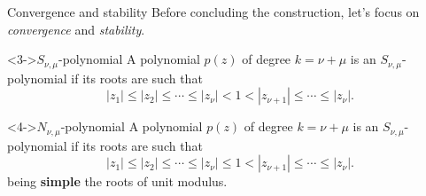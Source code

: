 \documentclass[aspectratio=169,xcolor=dvipsnames]{beamer}
\begin{document}
\begin{frame}{Convergence and stability}
Before concluding the construction, let's focus on \emph{convergence} and \emph{stability}.


\begin{block}<3->{$S_{\nu,\mu}$-polynomial \parencite[Definition 4.4.2]{MR1673796}}
A polynomial $p(z)$ of degree $k=\nu + \mu$ is an $S_{\nu,\mu}$-polynomial if its roots are such that
\[
|z_1| \leq |z_2| \leq \cdots \leq |z_{\nu}| < 1 < |z_{\nu+1}| \leq \cdots \leq |z_{\nu}|.
\]
\end{block}

\begin{block}<4->{$N_{\nu,\mu}$-polynomial \parencite[Definition 4.4.3]{MR1673796}}
	A polynomial $p(z)$ of degree $k=\nu + \mu$ is an $S_{\nu,\mu}$-polynomial if its roots are such that
	\[
	|z_1| \leq |z_2| \leq \cdots \leq |z_{\nu}| \leq 1 < |z_{\nu+1}| \leq \cdots \leq |z_{\nu}|.
	\]
	being \textbf{simple} the roots of unit modulus.
\end{block}


\end{frame}
\end{document}
